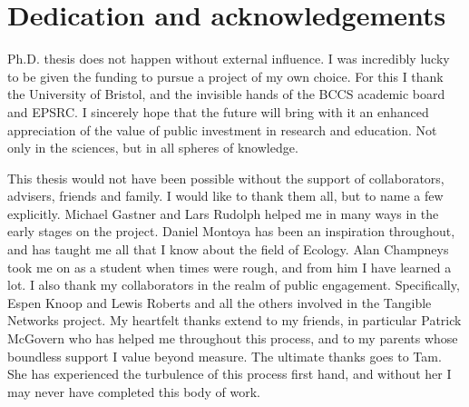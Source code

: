 %
%

\chapter*{Dedication and acknowledgements}
\begin{SingleSpace}
 Ph.D. thesis does not happen without external influence. I was incredibly lucky to be given the funding to pursue a project of my own choice. For this I thank the University of Bristol, and the invisible hands of the BCCS academic board and EPSRC. I sincerely hope that the future will bring with it an enhanced appreciation of the value of public investment in research and education. Not only in the sciences, but in all spheres of knowledge. 

This thesis would not have been possible without the support of collaborators, advisers, friends and family. I would like to thank them all, but to name a few explicitly. Michael Gastner and Lars Rudolph helped me in many ways in the early stages on the project. Daniel Montoya has been an inspiration throughout, and has taught me all that I know about the field of Ecology. Alan Champneys took me on as a student when times were rough, and from him I have learned a lot. I also thank my collaborators in the realm of public engagement. Specifically, Espen Knoop and Lewis Roberts and all the others involved in the Tangible Networks project. My heartfelt thanks extend to my friends, in particular Patrick McGovern who has helped me throughout this process, and to my parents whose boundless support I value beyond measure. The ultimate thanks goes to Tam. She has experienced the turbulence of this process first hand, and without her I may never have completed this body of work.


\end{SingleSpace}
